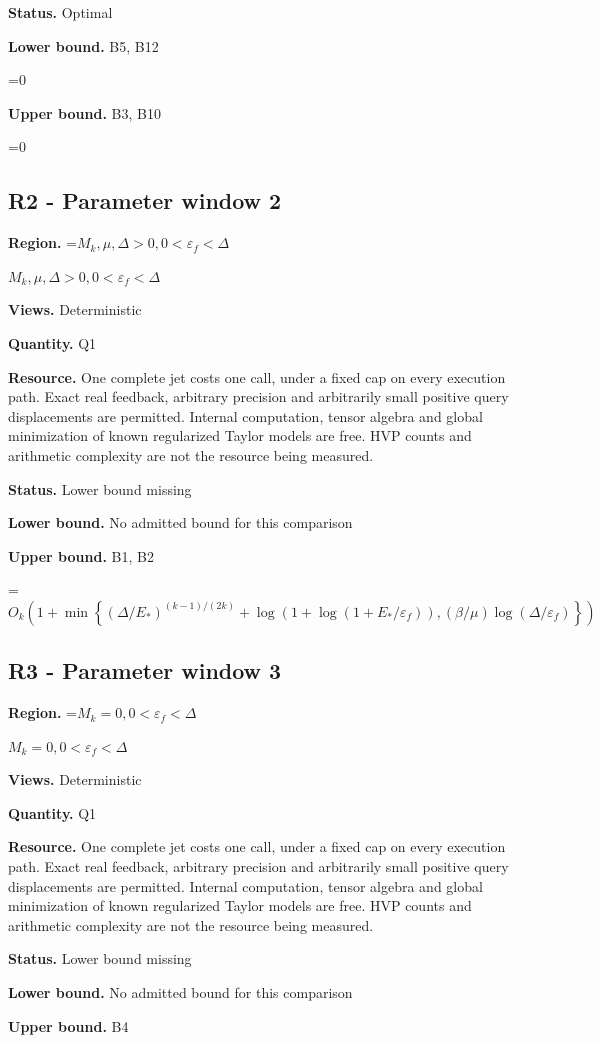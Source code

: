 \documentclass[10pt,a4paper]{article}
\newcommand{\AtlasMath}[1]{\par\begingroup\centering\setbox0=\hbox{$\displaystyle #1$}\ifdim\wd0>1.4\linewidth\typeout{ATLAS WIDE FORMULA: \the\wd0}\fi\ifdim\wd0>\linewidth\resizebox{\linewidth}{!}{\box0}\else\box0\fi\par\endgroup}
\newcommand{\AtlasInlineMath}[1]{\begingroup\setbox0=\hbox{$#1$}\ifdim\wd0>.4\linewidth\endgroup\AtlasMath{#1}\else\endgroup$#1$\fi}
\begin{document}
\textbf{Status.} Optimal

\textbf{Lower bound.} B5, B12

\AtlasMath{0}
\textbf{Upper bound.} B3, B10

\AtlasMath{0}
\subsection{R2 - Parameter window 2}
\textbf{Region.} \AtlasInlineMath{M_k,\mu,\Delta>0,0<\varepsilon_f<\Delta}

\textbf{Views.} Deterministic

\textbf{Quantity.} Q1

\textbf{Resource.} One complete jet costs one call, under a fixed cap on every execution path. Exact real feedback, arbitrary precision and arbitrarily small positive query displacements are permitted. Internal computation, tensor algebra and global minimization of known regularized Taylor models are free. HVP counts and arithmetic complexity are not the resource being measured.

\textbf{Status.} Lower bound missing

\textbf{Lower bound.} No admitted bound for this comparison

\textbf{Upper bound.} B1, B2

\AtlasMath{O_k\!\left(1+\min\left\{(\Delta/E_*)^{(k-1)/(2k)}+\log(1+\log(1+E_*/\varepsilon_f)),(\beta/\mu)\log(\Delta/\varepsilon_f)\right\}\right)}
\subsection{R3 - Parameter window 3}
\textbf{Region.} \AtlasInlineMath{M_k=0,0<\varepsilon_f<\Delta}

\textbf{Views.} Deterministic

\textbf{Quantity.} Q1

\textbf{Resource.} One complete jet costs one call, under a fixed cap on every execution path. Exact real feedback, arbitrary precision and arbitrarily small positive query displacements are permitted. Internal computation, tensor algebra and global minimization of known regularized Taylor models are free. HVP counts and arithmetic complexity are not the resource being measured.

\textbf{Status.} Lower bound missing

\textbf{Lower bound.} No admitted bound for this comparison

\textbf{Upper bound.} B4
\end{document}

